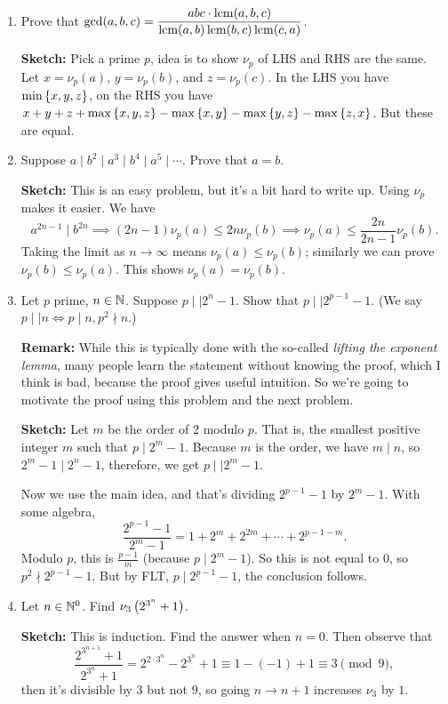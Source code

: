 \documentclass[11pt,paper=letter]{scrartcl}
\begin{document}
\begin{enumerate}
  \item Prove that $\displaystyle \gcd(a, b, c) = \frac{abc\cdot\operatorname*{lcm}(a, b, c)}{\operatorname*{lcm}(a, b)\operatorname*{lcm}(b, c)\operatorname*{lcm}(c, a)}$.

  \textbf{Sketch:} Pick a prime $p$, idea is to show $\nu_p$ of LHS and RHS are the same. Let $x = \nu_p(a)$, $y = \nu_p(b)$, and $z = \nu_p(c)$. In the LHS you have $\min\left\{ x, y, z \right\}$, on the RHS you have $x + y + z + \max\left\{ x, y, z \right\} - \max\left\{ x, y \right\} - \max\left\{ y, z \right\} - \max\left\{ z, x \right\}$. But these are equal.

  \item Suppose $a \mid b^2 \mid a^3 \mid b^4 \mid a^5 \mid \cdots$. Prove that $a = b$.

  \textbf{Sketch:} This is an easy problem, but it's a bit hard to write up. Using $\nu_p$ makes it easier. We have
  $$a^{2n - 1} \mid b^{2n} \implies (2n-1)\nu_p(a) \le 2n\nu_p(b) \implies \nu_p(a) \le \frac{2n}{2n-1} \nu_p(b).$$
  Taking the limit as $n \to \infty$ means $\nu_p(a) \le \nu_p(b)$; similarly we can prove $\nu_p(b) \le \nu_p(a)$. This shows $\nu_p(a) = \nu_p(b)$.

  \item Let $p$ prime, $n \in \mathbb N$. Suppose $p \mid \mid 2^n - 1$. Show that $p \mid \mid 2^{p-1} - 1$. (We say $p \mid \mid n \iff p \mid n, p^2 \nmid n$.)

  \textbf{Remark:} While this is typically done with the so-called \emph{lifting the exponent lemma}, many people learn the statement without knowing the proof, which I think is bad, because the proof gives useful intuition. So we're going to motivate the proof using this problem and the next problem.

  \textbf{Sketch:} Let $m$ be the order of $2$ modulo $p$. That is, the smallest positive integer $m$ such that $p \mid 2^m - 1$. Because $m$ is the order, we have $m \mid n$, so $2^m - 1 \mid 2^n - 1$, therefore, we get $p \mid \mid 2^m - 1$.

  Now we use the main idea, and that's dividing $2^{p-1} - 1$ by $2^m - 1$. With some algebra,
  $$\frac{2^{p-1} - 1}{2^m - 1} = 1 + 2^m + 2^{2m} + \cdots + 2^{p-1 - m}.$$
  Modulo $p$, this is $\frac{p- 1}{m}$ (because $p \mid 2^m - 1$). So this is not equal to $0$, so $p^2 \nmid 2^{p-1} - 1$. But by FLT, $p \mid 2^{p-1} - 1$, the conclusion follows.

  \item Let $n \in \mathbb N^0$. Find $\nu_3\left( 2^{3^n} + 1 \right)$.

  \textbf{Sketch:} This is induction. Find the answer when $n = 0$. Then observe that
  $$\frac{2^{3^{n+1}} + 1}{2^{3^n} + 1} = 2^{2\cdot 3^n} - 2^{3^n} + 1 \equiv 1 - (-1) + 1 \equiv 3 \pmod 9,$$
  then it's divisible by $3$ but not $9$, so going $n \to n + 1$ increases $\nu_3$ by $1$.
\end{enumerate}
\end{document}
